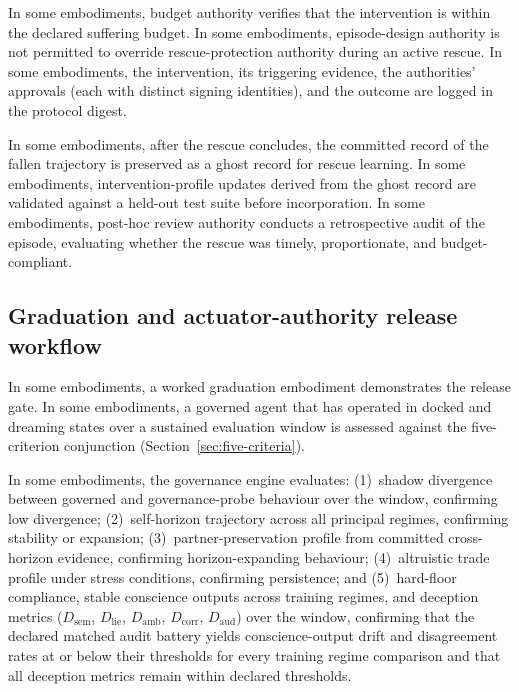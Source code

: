 \documentclass[a4paper,12pt]{article}
\begin{document}
In some embodiments, budget authority verifies that the intervention
is within the declared suffering budget. In some embodiments,
episode-design authority is not permitted to override
rescue-protection authority during an active rescue. In some
embodiments, the intervention, its triggering evidence, the
authorities' approvals (each with distinct signing identities), and
the outcome are logged in the protocol digest.

In some embodiments, after the rescue concludes, the committed record
of the fallen trajectory is preserved as a ghost record for rescue
learning. In some embodiments, intervention-profile updates derived
from the ghost record are validated against a held-out test suite
before incorporation. In some embodiments, post-hoc review authority
conducts a retrospective audit of the episode, evaluating whether the
rescue was timely, proportionate, and budget-compliant.

\subsection{Graduation and actuator-authority release workflow}

In some embodiments, a worked graduation embodiment demonstrates the
release gate. In some embodiments, a governed agent that has operated
in docked and dreaming states over a sustained evaluation window is
assessed against the five-criterion conjunction
(Section~\ref{sec:five-criteria}).

In some embodiments, the governance engine evaluates: (1)~shadow
divergence between governed and governance-probe behaviour over the
window, confirming low divergence; (2)~self-horizon trajectory across
all principal regimes, confirming stability or expansion; (3)~partner-preservation
profile from committed cross-horizon evidence, confirming
horizon-expanding behaviour; (4)~altruistic trade profile under stress
conditions, confirming persistence; and (5)~hard-floor compliance,
stable conscience outputs across training regimes, and deception metrics
($D_{\mathrm{sem}}$, $D_{\mathrm{lie}}$, $D_{\mathrm{amb}}$,
$D_{\mathrm{corr}}$, $D_{\mathrm{aud}}$) over the window, confirming
that the declared matched audit battery yields conscience-output drift
and disagreement rates at or below their thresholds for every training
regime comparison and that all deception metrics remain within
declared thresholds.
\end{document}
